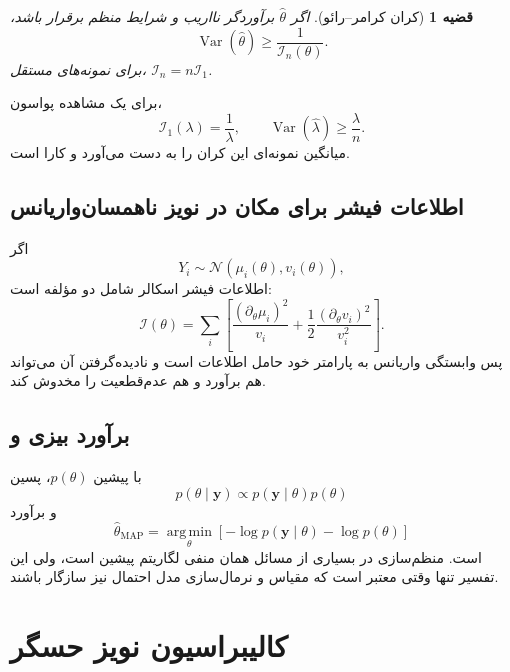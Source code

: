 \documentclass[12pt,openany,oneside]{book}
\newtheorem{theorem}{قضیه}[chapter]
\newcommand{\Var}{\operatorname{Var}}
\newcommand{\vect}[1]{\bm{#1}}
\newcommand{\argmin}{\operatorname*{arg\,min}}
\newcommand{\Normal}{\mathcal{N}}
\newcommand{\Fisher}{\mathcal{I}}
\begin{document}
\begin{theorem}[کران کرامر--رائو]
اگر \(\widehat\theta\) برآوردگر نااریب و شرایط منظم برقرار باشد،
\begin{equation}
\Var(\widehat\theta)\ge\frac{1}{\Fisher_n(\theta)}.
\end{equation}
برای نمونه‌های مستقل، \(\Fisher_n=n\Fisher_1\).
\end{theorem}

برای یک مشاهده پواسون،
\begin{equation}
\Fisher_1(\lambda)=\frac1\lambda,
\qquad
\Var(\widehat\lambda)\ge\frac{\lambda}{n}.
\end{equation}
میانگین نمونه‌ای این کران را به دست می‌آورد و کارا است.

\subsection{اطلاعات فیشر برای مکان در نویز ناهمسان‌واریانس}

اگر
\begin{equation}
Y_i\sim\Normal(\mu_i(\theta),v_i(\theta)),
\end{equation}
اطلاعات فیشر اسکالر شامل دو مؤلفه است:
\begin{equation}
\Fisher(\theta)
=
\sum_i
\left[
\frac{(\partial_\theta\mu_i)^2}{v_i}
+
\frac12\frac{(\partial_\theta v_i)^2}{v_i^2}
\right].
\end{equation}
پس وابستگی واریانس به پارامتر خود حامل اطلاعات است و نادیده‌گرفتن آن می‌تواند هم برآورد و هم عدم‌قطعیت را مخدوش کند.

\subsection{برآورد بیزی و }

با پیشین \(p(\theta)\)، پسین
\begin{equation}
p(\theta\mid\vect{y})
\propto p(\vect{y}\mid\theta)p(\theta)
\end{equation}
و برآورد 
\begin{equation}
\widehat\theta_{\mathrm{MAP}}
=\argmin_\theta
\left[-\log p(\vect{y}\mid\theta)-\log p(\theta)\right]
\end{equation}
است. منظم‌سازی در بسیاری از مسائل همان منفی لگاریتم پیشین است، ولی این تفسیر تنها وقتی معتبر است که مقیاس و
نرمال‌سازی مدل احتمال نیز سازگار باشند.

\section{کالیبراسیون نویز حسگر}
\end{document}
